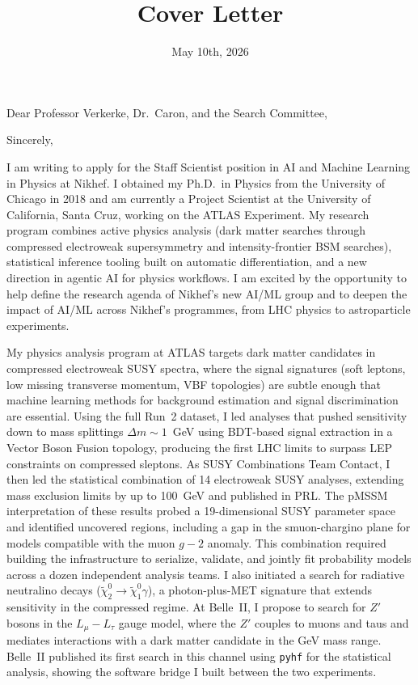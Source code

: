 \documentclass[10pt,letterpaper,sans]{moderncv} %
\title{Cover Letter}
\begin{document}
\date{May 10th, 2026}
\opening{Dear Professor Verkerke, Dr.\ Caron, and the Search Committee,}
\closing{Sincerely,}

\makelettertitle
\vspace*{-1em}

I am writing to apply for the Staff Scientist position in AI and Machine Learning in Physics at Nikhef. I obtained my Ph.D.\ in Physics from the University of Chicago in 2018 and am currently a Project Scientist at the University of California, Santa Cruz, working on the ATLAS Experiment. My research program combines active physics analysis (dark matter searches through compressed electroweak supersymmetry and intensity-frontier BSM searches), statistical inference tooling built on automatic differentiation, and a new direction in agentic AI for physics workflows. I am excited by the opportunity to help define the research agenda of Nikhef's new AI/ML group and to deepen the impact of AI/ML across Nikhef's programmes, from LHC physics to astroparticle experiments.

My physics analysis program at ATLAS targets dark matter candidates in compressed electroweak SUSY spectra, where the signal signatures (soft leptons, low missing transverse momentum, VBF topologies) are subtle enough that machine learning methods for background estimation and signal discrimination are essential. Using the full Run~2 dataset, I led analyses that pushed sensitivity down to mass splittings $\Delta m \sim 1$~GeV using BDT-based signal extraction in a Vector Boson Fusion topology, producing the first LHC limits to surpass LEP constraints on compressed sleptons. As SUSY Combinations Team Contact, I then led the statistical combination of 14 electroweak SUSY analyses, extending mass exclusion limits by up to 100~GeV and published in PRL. The pMSSM interpretation of these results probed a 19-dimensional SUSY parameter space and identified uncovered regions, including a gap in the smuon-chargino plane for models compatible with the muon $g-2$ anomaly. This combination required building the infrastructure to serialize, validate, and jointly fit probability models across a dozen independent analysis teams. I also initiated a search for radiative neutralino decays ($\tilde{\chi}_2^0 \to \tilde{\chi}_1^0 \gamma$), a photon-plus-MET signature that extends sensitivity in the compressed regime. At Belle~II, I propose to search for $Z'$ bosons in the $L_\mu - L_\tau$ gauge model, where the $Z'$ couples to muons and taus and mediates interactions with a dark matter candidate in the GeV mass range. Belle~II published its first search in this channel using \texttt{pyhf} for the statistical analysis, showing the software bridge I built between the two experiments.
\end{document}
